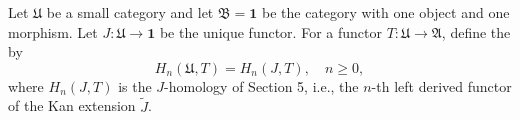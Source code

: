 Let $\mathfrak{U}$ be a small category and let $\mathfrak{B} = \mathbf{1}$ be the category with one object and one morphism. Let $J: \mathfrak{U} \rightarrow \mathbf{1}$ be the unique functor. For a functor $T: \mathfrak{U} \rightarrow \mathfrak{A}$, define the  by
$$
H_n(\mathfrak{U}, T) = H_n(J, T), \quad n \geq 0,
$$
where $H_n(J, T)$ is the $J$-homology of Section 5, i.e., the $n$-th left derived functor of the Kan extension $\tilde{J}$.
